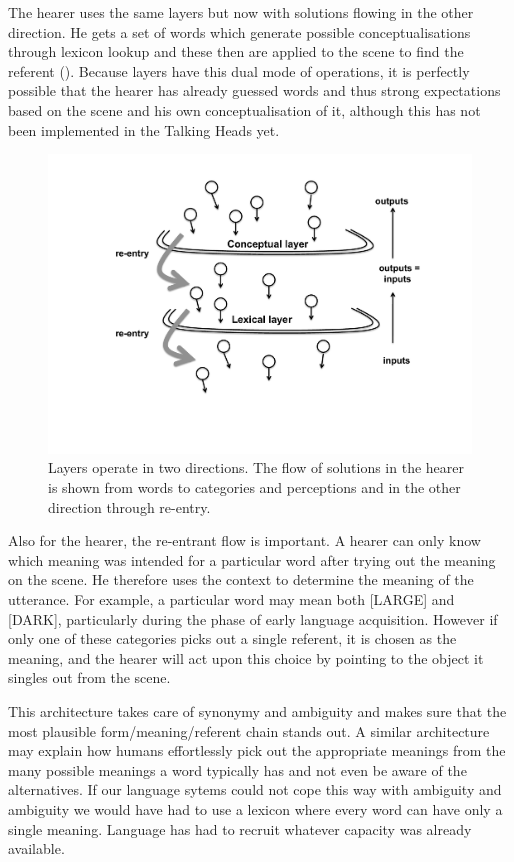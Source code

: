 The hearer uses the same layers but now with solutions
flowing in the other direction. He gets a set of words
which generate possible conceptualisations through 
lexicon lookup and these then are applied to the 
scene to find the referent (). Because 
layers have this dual mode of operations, it is perfectly 
possible that the hearer has already guessed words and 
thus strong expectations based on the scene and his 
own conceptualisation of it, although this has not been
implemented in the Talking Heads yet. 


\begin{figure}[htbp]
  \centerline{\includegraphics[width=.65\textwidth]{chap6/figs/sieve2b}}
\caption{\label{sieve2b} Layers operate in two 
directions. The flow of solutions in the hearer is shown from words to categories and perceptions
and in the other direction through re-entry.}
\end{figure}

Also for the hearer, the re-entrant flow is important. 
A hearer can only know which meaning was intended for a particular
word after trying out the meaning on the scene. He
therefore uses the context to determine the meaning of 
the utterance. For example, a particular word may mean both [LARGE]
and [DARK], particularly during the phase of 
early language acquisition. However if only one of these categories
picks out a single referent, it is chosen as 
the meaning, and the hearer will act upon this choice by 
pointing to the object it singles out from the scene. 

This architecture takes care of synonymy and ambiguity and
makes sure that the most plausible form/meaning/referent
chain stands out. A similar architecture may explain how
humans effortlessly pick out the appropriate meanings from 
the many possible meanings a word typically has and not even 
be aware of the alternatives. If our language sytems 
could not cope this way with ambiguity and ambiguity we 
would have had to use a lexicon where every word can 
have only a single meaning. Language has had to 
recruit whatever capacity was already available. 


